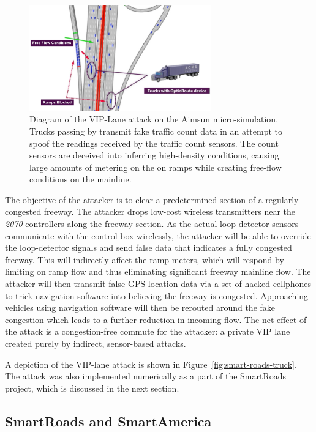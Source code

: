 \begin{figure}[t]
    \centering
    \includegraphics[width=0.7\textwidth]{diagrams/trucks}
    \caption[Diagram of the VIP-Lane attack on the Aimsun micro-simulation.]{Diagram of the VIP-Lane attack on the Aimsun micro-simulation. Trucks passing by transmit fake traffic count data in an attempt to spoof the readings received by the traffic count sensors. The count sensors are deceived into inferring high-density conditions, causing large amounts of metering on the on ramps while creating free-flow conditions on the mainline.}
    \label{fig:smart-roads-diagram}
\end{figure}


            The objective of the attacker is to clear a predetermined section of a regularly congested freeway. The attacker drops low-cost wireless transmitters near the \emph{2070} controllers along the freeway section. As the actual loop-detector sensors communicate with the control box wirelessly, the attacker will be able to override the loop-detector signals and send false data that indicates a fully congested freeway. This will indirectly affect the ramp meters, which will respond by limiting on ramp flow and thus eliminating significant freeway mainline flow. The attacker will then transmit false GPS location data via a set of hacked cellphones to trick navigation software into believing the freeway is congested. Approaching vehicles using navigation software will then be rerouted around the fake congestion which leads to a further reduction in incoming flow. The net effect of the attack is a congestion-free commute for the attacker: a private VIP lane created purely by indirect, sensor-based attacks.

A depiction of the VIP-lane attack is shown in Figure~\ref{fig:smart-roads-truck}. The attack was also implemented numerically as a part of the SmartRoads project, which is discussed in the next section.

\subsection{SmartRoads and SmartAmerica}

